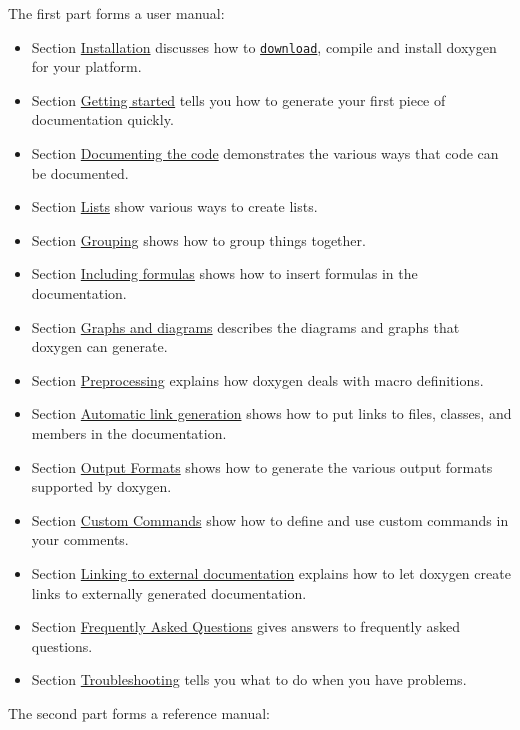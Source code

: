 The first part forms a user manual: \begin{itemize}
\item Section \hyperlink{install}{Installation} discusses how to \href{http://www.doxygen.org/download.html}{\tt download}, compile and install doxygen for your platform. \item Section \hyperlink{starting}{Getting started} tells you how to generate your first piece of documentation quickly. \item Section \hyperlink{docblocks}{Documenting the code} demonstrates the various ways that code can be documented. \item Section \hyperlink{lists}{Lists} show various ways to create lists. \item Section \hyperlink{grouping}{Grouping} shows how to group things together. \item Section \hyperlink{formulas}{Including formulas} shows how to insert formulas in the documentation. \item Section \hyperlink{diagrams}{Graphs and diagrams} describes the diagrams and graphs that doxygen can generate. \item Section \hyperlink{preprocessing}{Preprocessing} explains how doxygen deals with macro definitions. \item Section \hyperlink{autolink}{Automatic link generation} shows how to put links to files, classes, and members in the documentation. \item Section \hyperlink{output}{Output Formats} shows how to generate the various output formats supported by doxygen. \item Section \hyperlink{custcmd}{Custom Commands} show how to define and use custom commands in your comments. \item Section \hyperlink{external}{Linking to external documentation} explains how to let doxygen create links to externally generated documentation. \item Section \hyperlink{faq}{Frequently Asked Questions} gives answers to frequently asked questions. \item Section \hyperlink{trouble}{Troubleshooting} tells you what to do when you have problems. \end{itemize}


The second part forms a reference manual:

